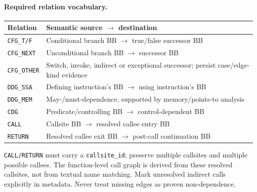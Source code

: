 \documentclass[10pt,a4paper]{article}
\begin{document}
\paragraph{Required relation vocabulary.}
\begin{center}\small
\begin{tabular}{p{26mm}p{93mm}}
\toprule
Relation & Semantic source $\rightarrow$ destination \\
\midrule
\texttt{CFG\_T/F} & Conditional branch BB $\rightarrow$ true/false successor BB \\
\texttt{CFG\_NEXT} & Unconditional branch BB $\rightarrow$ successor BB \\
\texttt{CFG\_OTHER} & Switch, invoke, indirect or exceptional successor; persist case/edge-kind evidence \\
\texttt{DDG\_SSA} & Defining instruction's BB $\rightarrow$ using instruction's BB \\
\texttt{DDG\_MEM} & May-/must-dependence, supported by memory/points-to analysis \\
\texttt{CDG} & Predicate/controlling BB $\rightarrow$ control-dependent BB \\
\texttt{CALL} & Callsite BB $\rightarrow$ resolved callee entry BB \\
\texttt{RETURN} & Resolved callee exit BB $\rightarrow$ post-call continuation BB \\
\bottomrule
\end{tabular}
\end{center}
\texttt{CALL/RETURN} must carry a \texttt{callsite\_id}; preserve multiple callsites and multiple possible callees. The function-level call graph is derived from these resolved callsites, not from textual name matching. Mark unresolved indirect calls explicitly in metadata. Never treat missing edges as proven non-dependence.
\end{document}
